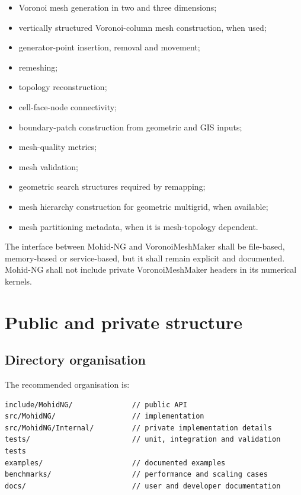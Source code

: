 \documentclass[11pt,a4paper]{article}
\begin{document}
\begin{itemize}
  \item Voronoi mesh generation in two and three dimensions;
  \item vertically structured Voronoi-column mesh construction, when used;
  \item generator-point insertion, removal and movement;
  \item remeshing;
  \item topology reconstruction;
  \item cell-face-node connectivity;
  \item boundary-patch construction from geometric and GIS inputs;
  \item mesh-quality metrics;
  \item mesh validation;
  \item geometric search structures required by remapping;
  \item mesh hierarchy construction for geometric multigrid, when available;
  \item mesh partitioning metadata, when it is mesh-topology dependent.
\end{itemize}

The interface between Mohid-NG and VoronoiMeshMaker shall be file-based, memory-based or service-based, but it shall remain explicit and documented. Mohid-NG shall not include private VoronoiMeshMaker headers in its numerical kernels.

\section{Public and private structure}

\subsection{Directory organisation}

The recommended organisation is:

\begin{lstlisting}[style=mohidcpp]
include/MohidNG/              // public API
src/MohidNG/                  // implementation
src/MohidNG/Internal/         // private implementation details
tests/                        // unit, integration and validation tests
examples/                     // documented examples
benchmarks/                   // performance and scaling cases
docs/                         // user and developer documentation
\end{lstlisting}
\end{document}
